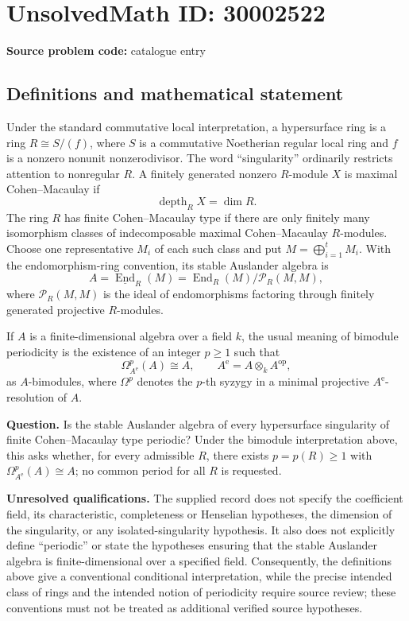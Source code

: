 \documentclass[11pt]{article}
\begin{document}
\section*{UnsolvedMath ID: 30002522}
\textbf{Source problem code:} catalogue entry
\subsection{Definitions and mathematical statement}
Under the standard commutative local interpretation, a hypersurface ring is a ring \(R\cong S/(f)\), where \(S\) is a commutative Noetherian regular local ring and \(f\) is a nonzero nonunit nonzerodivisor. The word ``singularity'' ordinarily restricts attention to nonregular \(R\). A finitely generated nonzero \(R\)-module \(X\) is maximal Cohen--Macaulay if
\[
\operatorname{depth}_R X=\dim R.
\]
The ring \(R\) has finite Cohen--Macaulay type if there are only finitely many isomorphism classes of indecomposable maximal Cohen--Macaulay \(R\)-modules. Choose one representative \(M_i\) of each such class and put \(M=\bigoplus_{i=1}^{t}M_i\). With the endomorphism-ring convention, its stable Auslander algebra is
\[
A=\underline{\operatorname{End}}_R(M)
 =\operatorname{End}_R(M)/\mathcal P_R(M,M),
\]
where \(\mathcal P_R(M,M)\) is the ideal of endomorphisms factoring through finitely generated projective \(R\)-modules.

If \(A\) is a finite-dimensional algebra over a field \(k\), the usual meaning of bimodule periodicity is the existence of an integer \(p\geq 1\) such that
\[
\Omega^p_{A^{\mathrm e}}(A)\cong A,
\qquad A^{\mathrm e}=A\otimes_k A^{\mathrm{op}},
\]
as \(A\)-bimodules, where \(\Omega^p\) denotes the \(p\)-th syzygy in a minimal projective \(A^{\mathrm e}\)-resolution of \(A\).

\textbf{Question.} Is the stable Auslander algebra of every hypersurface singularity of finite Cohen--Macaulay type periodic? Under the bimodule interpretation above, this asks whether, for every admissible \(R\), there exists \(p=p(R)\geq 1\) with \(\Omega^p_{A^{\mathrm e}}(A)\cong A\); no common period for all \(R\) is requested.

\textbf{Unresolved qualifications.} The supplied record does not specify the coefficient field, its characteristic, completeness or Henselian hypotheses, the dimension of the singularity, or any isolated-singularity hypothesis. It also does not explicitly define ``periodic'' or state the hypotheses ensuring that the stable Auslander algebra is finite-dimensional over a specified field. Consequently, the definitions above give a conventional conditional interpretation, while the precise intended class of rings and the intended notion of periodicity require source review; these conventions must not be treated as additional verified source hypotheses.
\end{document}
